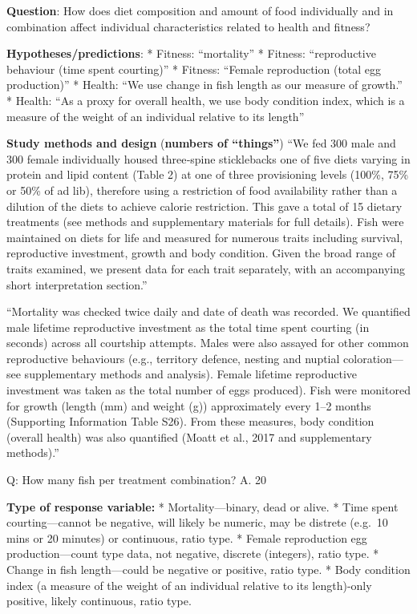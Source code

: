 \documentclass[]{book}
\begin{document}
\textbf{Question}:
How does diet composition and amount of food individually and in combination affect individual characteristics related to health and fitness?

\textbf{Hypotheses/predictions}:
* Fitness: ``mortality''
* Fitness: ``reproductive behaviour (time spent courting)''
* Fitness: ``Female reproduction (total egg production)''
* Health: ``We use change in fish length as our measure of growth.''
* Health: ``As a proxy for overall health, we use body condition index, which is a measure of the weight of an individual relative to its length''

\textbf{Study methods and design} (\textbf{numbers of ``things''}) ``We fed 300 male and 300 female individually housed three‐spine sticklebacks one of five diets varying in protein and lipid content (Table 2) at one of three provisioning levels (100\%, 75\% or 50\% of ad lib), therefore using a restriction of food availability rather than a dilution of the diets to achieve calorie restriction. This gave a total of 15 dietary treatments (see methods and supplementary materials for full details). Fish were maintained on diets for life and measured for numerous traits including survival, reproductive investment, growth and body condition. Given the broad range of traits examined, we present data for each trait separately, with an accompanying short interpretation section.''

``Mortality was checked twice daily and date of death was recorded. We quantified male lifetime reproductive investment as the total time spent courting (in seconds) across all courtship attempts. Males were also assayed for other common reproductive behaviours (e.g., territory defence, nesting and nuptial coloration---see supplementary methods and analysis). Female lifetime reproductive investment was taken as the total number of eggs produced). Fish were monitored for growth (length (mm) and weight (g)) approximately every 1--2 months (Supporting Information Table S26). From these measures, body condition (overall health) was also quantified (Moatt et al., 2017 and supplementary methods).''

Q: How many fish per treatment combination? A. 20

\textbf{Type of response variable:}
* Mortality---binary, dead or alive.
* Time spent courting---cannot be negative, will likely be numeric, may be distrete (e.g.~10 mins or 20 minutes) or continuous, ratio type.
* Female reproduction egg production---count type data, not negative, discrete (integers), ratio type.
* Change in fish length---could be negative or positive, ratio type.
* Body condition index (a measure of the weight of an individual relative to its length)-only positive, likely continuous, ratio type.
\end{document}
